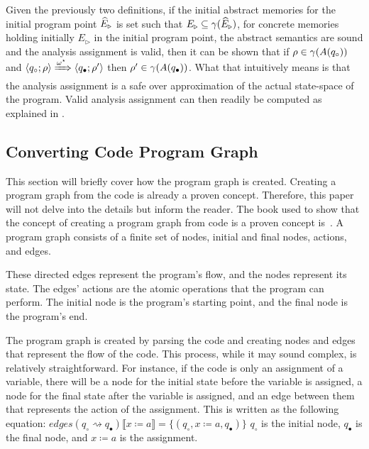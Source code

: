 Given the previously two definitions, if the initial abstract memories for the initial program point $\widehat{E}_\triangleright$ is set such that $E_{\triangleright} \subseteq \gamma(\widehat{E}_\triangleright)$, for concrete memories holding initially $E_{\triangleright}$ in the initial program point, the abstract semantics are sound and the analysis assignment is valid, then it can be shown that if $\rho \in \gamma(A(q_\circ))$ and $\langle q_\circ; \rho \rangle \xRightarrow{\omega^\star} \langle q_\bullet; \rho' \rangle$ then $\rho' \in \gamma(A(q_\bullet))$.
What that intuitively means is that the analysis assignment is a safe over approximation of the actual state-space of the program.
Valid analysis assignment can then readily be computed as explained in \cite{nielson_formal_2019}.


\subsection{Converting Code Program Graph}\label{subsec:converting-code-program-graph}
This section will briefly cover how the program graph is created.
Creating a program graph from the code is already a proven concept.
Therefore, this paper will not delve into the details but inform the reader.
The book used to show that the concept of creating a program graph from code is a proven concept is~\cite[see][chap 2.2]{nielson_formal_2019}.
A program graph consists of a finite set of nodes, initial and final nodes, actions, and edges.

These directed edges represent the program's flow, and the nodes represent its state.
The edges' actions are the atomic operations that the program can perform.
The initial node is the program's starting point, and the final node is the program's end.

The program graph is created by parsing the code and creating nodes and edges that represent the flow of the code.
This process, while it may sound complex, is relatively straightforward.
For instance, if the code is only an assignment of a variable, there will be a node for the initial state before the variable is assigned, a node for the final state after the variable is assigned, and an edge between them that represents the action of the assignment.
This is written as the following equation:
$edges(q_{\circ} \rightsquigarrow q_{\bullet})\llbracket x \coloneqq a \rrbracket = \{(q_{\circ}, x \coloneqq a, q_{\bullet})\}$
$q_{\circ}$ is the initial node, $q_{\bullet}$ is the final node, and $x \coloneqq a$ is the assignment.

